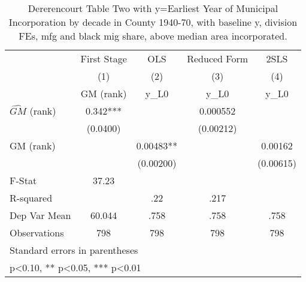 \begin{table}[htbp]\centering
\def\sym#1{\ifmmode^{#1}\else\(^{#1}\)\fi}
\caption{Dererencourt Table Two with y=Earliest Year of Municipal Incorporation by decade in County 1940-70, with baseline y, division FEs, mfg and black mig share, above median area incorporated.}
\begin{tabular}{l*{4}{c}}
\toprule
                    & First Stage   &         OLS   &Reduced Form   &        2SLS   \\
                    &\multicolumn{1}{c}{(1)}&\multicolumn{1}{c}{(2)}&\multicolumn{1}{c}{(3)}&\multicolumn{1}{c}{(4)}\\
                    &\multicolumn{1}{c}{GM  (rank)}&\multicolumn{1}{c}{y\_L0}&\multicolumn{1}{c}{y\_L0}&\multicolumn{1}{c}{y\_L0}\\
\midrule
$\hat{GM}$ (rank)   &       0.342***&               &    0.000552   &               \\
                    &    (0.0400)   &               &   (0.00212)   &               \\
\addlinespace
GM  (rank)          &               &     0.00483** &               &     0.00162   \\
                    &               &   (0.00200)   &               &   (0.00615)   \\
\midrule
F-Stat              &       37.23   &               &               &               \\
R-squared           &               &         .22   &        .217   &               \\
Dep Var Mean        &      60.044   &        .758   &        .758   &        .758   \\
Observations        &         798   &         798   &         798   &         798   \\
\bottomrule
\multicolumn{5}{l}{\footnotesize Standard errors in parentheses}\\
\multicolumn{5}{l}{\footnotesize * p<0.10, ** p<0.05, *** p<0.01}\\
\end{tabular}
\end{table}
